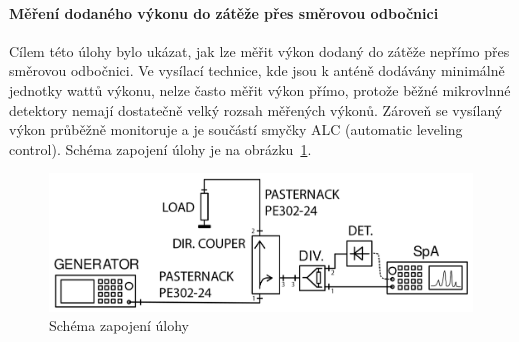 \documentclass[11pt,a4paper]{article}
\begin{document}
\paragraph*{Měření dodaného výkonu do zátěže přes směrovou odbočnici} Cílem této úlohy bylo ukázat, jak lze měřit výkon dodaný do zátěže nepřímo přes směrovou odbočnici. Ve vysílací technice, kde jsou k anténě dodávány minimálně jednotky wattů výkonu, nelze často měřit výkon přímo, protože běžné mikrovlnné detektory nemají dostatečně velký rozsah měřených výkonů. Zároveň se vysílaný výkon průběžně monitoruje a je součástí smyčky ALC (automatic leveling control). Schéma zapojení úlohy je na obrázku~\ref{fig:task2-zapojeni}.
\begin{figure}[!ht]
    \centering
    \includegraphics[width=.8\textwidth]{src/task2-zapojeni.png}
    \caption{\label{fig:task2-zapojeni}Schéma zapojení úlohy}
\end{figure}
\end{document}
